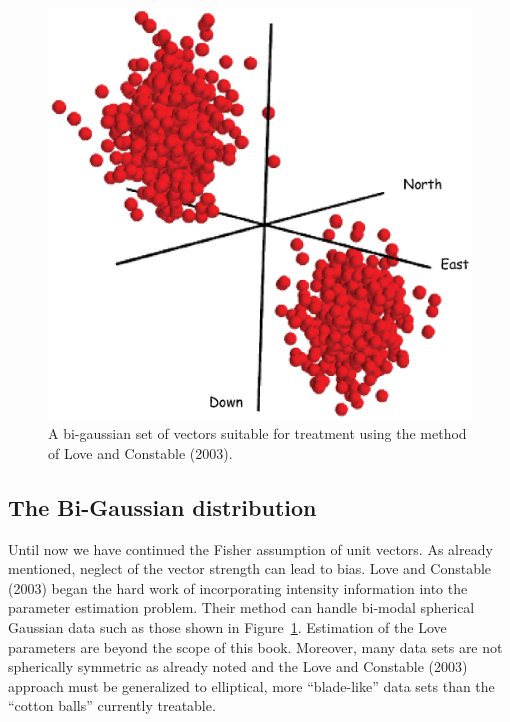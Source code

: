  
 \begin{figure}[htb]
\centering  \includegraphics[width=12 cm]{EPSfiles/love.eps}
\caption{A bi-gaussian set of vectors suitable for treatment using the method of Love and Constable (2003).  }
\label{fig:love}
\end{figure}\nocite{love03}

\subsection{The Bi-Gaussian distribution}

Until now we have continued the Fisher assumption of unit vectors.  As already mentioned,  neglect of the vector strength  can lead to bias.  
 Love and Constable (2003) \nocite{love03}
began the hard work of incorporating intensity information into the parameter estimation problem.  Their method can handle bi-modal spherical Gaussian data such as those shown in Figure~\ref{fig:love}. Estimation of the Love parameters are beyond the scope of this book.   Moreover, many data sets are not spherically symmetric as already noted and the Love and Constable (2003) approach must be generalized to elliptical, more ``blade-like'' data sets than the ``cotton balls'' currently treatable.  


